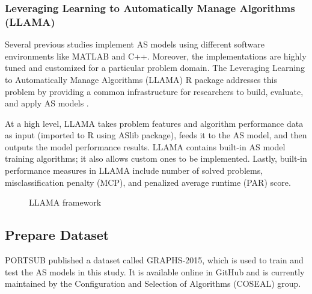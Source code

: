\subsubsection{Leveraging Learning to Automatically Manage Algorithms (LLAMA)}

Several previous studies implement AS models using different software environments like MATLAB and C++. Moreover, the implementations are highly tuned and customized for a particular problem domain. The Leveraging Learning to Automatically Manage Algorithms (LLAMA) R package addresses this problem by providing a common infrastructure for researchers to build, evaluate, and apply AS models \citep{kotthoff2013llama}. 

At a high level, LLAMA takes problem features and algorithm performance data as input (imported to R using ASlib package), feeds it to the AS model, and then outputs the model performance results. LLAMA contains built-in AS model training algorithms; it also allows custom ones to be implemented. Lastly, built-in performance measures in LLAMA include number of solved problems, misclassification penalty (MCP), and penalized average runtime (PAR) score.

\begin{figure}[H]
	\centering
	\caption{LLAMA framework}
	\label{fig:llama}
\end{figure}

\subsection{Prepare Dataset}
PORTSUB published a dataset called GRAPHS-2015, which is used to train and test the AS models in this study. It is available online in GitHub \citep{graphs2015} and is currently maintained by the Configuration and Selection of Algorithms (COSEAL) group.


